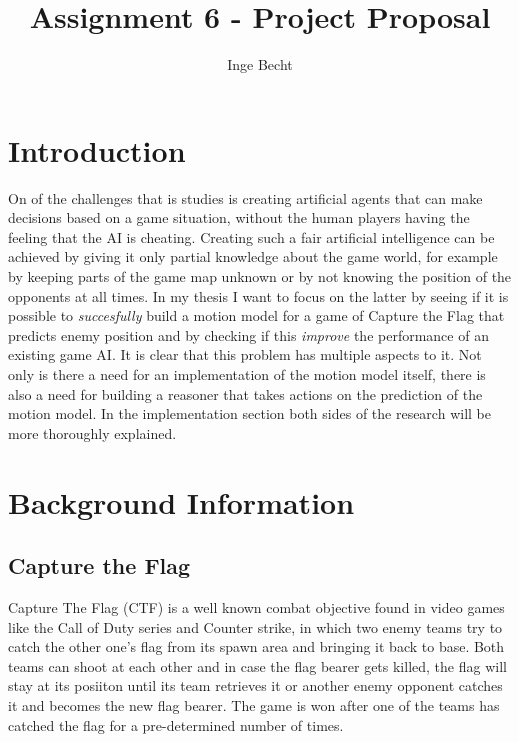\documentclass[a4paper, 12pt]{article}
\author{Inge Becht}
\title{Assignment 6 - Project Proposal}
\begin{document}
\maketitle

\section{Introduction}
On of the challenges that is studies is creating artificial agents that can make
decisions based on a game situation, without the human players having the
feeling that the AI is cheating. Creating such a fair artificial intelligence can be achieved by
giving it only partial knowledge about the game world, for example by keeping parts of
the game map unknown or by not knowing the position of the opponents at all
times. In my thesis I want to focus on the latter by seeing if it is possible to
\emph{succesfully} build a motion model for a game of Capture the Flag that
predicts enemy position and by checking if this \emph{improve} the performance of an
existing game AI. It is clear that this problem has multiple aspects to it. Not
only is there a need for an implementation of the motion model itself, there is
also a need for building a reasoner that takes actions on the prediction of the
motion model. In the implementation section both sides of the research will be
more thoroughly explained. 


\section{Background Information}

\subsection{Capture the Flag}
Capture The Flag (CTF) is a well known combat objective found in video games
like the Call of Duty series and Counter strike, in which two enemy teams try to
catch the other one's flag from its spawn area and bringing it back to base.
Both teams can shoot at each other and in case the flag bearer gets killed, the
flag will stay at its posiiton until its team retrieves it or another enemy
opponent catches it and becomes the new flag bearer. The game is won after one
of the teams has catched the flag for a pre-determined number of times.
\end{document}
